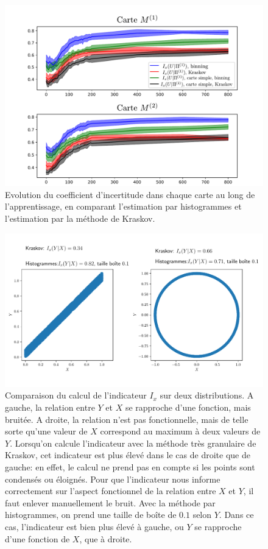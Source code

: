 \begin{figure}
\includegraphics[width=\textwidth]{evolution_MI}
\caption{Evolution du coefficient d'incertitude dans chaque carte au long de l'apprentissage, en comparant l'estimation par histogrammes et l'estimation par la méthode de Kraskov.}
\label{fig:MI_evol_total}
\end{figure}

\begin{figure}
    \centering
    \includegraphics[width=\textwidth]{comparaison_binning_kraskov.pdf}
    \caption{Comparaison du calcul de l'indicateur $I_x$ sur deux distributions. A gauche, la relation entre $Y$ et $X$ se rapproche d'une fonction, mais bruitée. A droite, la relation n'est pas fonctionnelle, mais de telle sorte qu'une valeur de $X$ correspond au maximum à deux valeurs de $Y$. Lorsqu'on calcule l'indicateur avec la méthode très granulaire de Kraskov, cet indicateur est plus élevé dans le cas de droite que de gauche: en effet, le calcul ne prend pas en compte si les points sont condensés ou éloignés. Pour que l'indicateur nous informe correctement sur l'aspect fonctionnel de la relation entre $X$ et $Y$, il faut enlever manuellement le bruit. Avec la méthode par histogrammes, on prend une taille de boîte de $0.1$ selon $Y$. Dans ce cas, l'indicateur est bien plus élevé à gauche, ou $Y$ se rapproche d'une fonction de $X$, que à droite.}
    \label{fig:exemple-limite}
    \end{figure}

